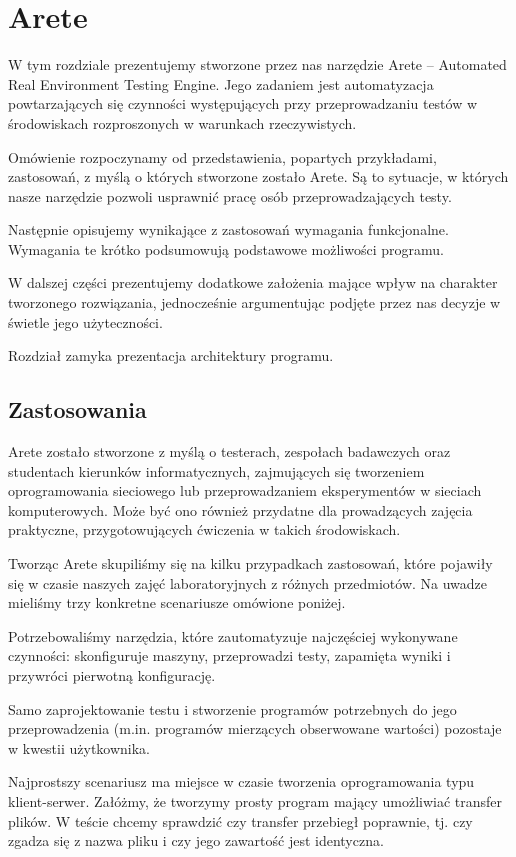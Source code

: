 \documentclass[00-praca-magisterska.tex]{subfiles}
\begin{document}
\chapter{Arete}

W tym rozdziale prezentujemy stworzone przez nas narzędzie Arete -- Automated
Real Environment Testing Engine. Jego zadaniem jest automatyzacja
powtarzających się czynności występujących przy przeprowadzaniu testów w
środowiskach rozproszonych w warunkach rzeczywistych.

Omówienie rozpoczynamy od przedstawienia, popartych przykładami, zastosowań, z
myślą o których stworzone zostało Arete. Są to sytuacje, w których nasze
narzędzie pozwoli usprawnić pracę osób przeprowadzających testy.

Następnie opisujemy wynikające z zastosowań wymagania funkcjonalne. Wymagania
te krótko podsumowują podstawowe możliwości programu.

W dalszej części prezentujemy dodatkowe założenia mające wpływ na charakter
tworzonego rozwiązania, jednocześnie argumentując podjęte przez nas decyzje w
świetle jego użyteczności.

Rozdział zamyka prezentacja architektury programu.

\section{Zastosowania}

Arete zostało stworzone z myślą o testerach, zespołach badawczych oraz
studentach kierunków informatycznych, zajmujących się tworzeniem oprogramowania
sieciowego lub przeprowadzaniem eksperymentów w sieciach komputerowych. Może być
ono również przydatne dla prowadzących zajęcia praktyczne, przygotowujących
ćwiczenia w takich środowiskach.

Tworząc Arete skupiliśmy się na kilku przypadkach zastosowań, które pojawiły
się w czasie naszych zajęć laboratoryjnych z różnych przedmiotów. Na uwadze
mieliśmy trzy konkretne scenariusze omówione poniżej.

Potrzebowaliśmy narzędzia, które zautomatyzuje najczęściej wykonywane
czynności: skonfiguruje maszyny, przeprowadzi testy, zapamięta wyniki i
przywróci pierwotną konfigurację.

Samo zaprojektowanie testu i stworzenie programów potrzebnych do jego
przeprowadzenia (m.in. programów mierzących obserwowane wartości) pozostaje w
kwestii użytkownika.

Najprostszy scenariusz ma miejsce w czasie tworzenia oprogramowania typu
klient-serwer. Załóżmy, że tworzymy prosty program mający umożliwiać transfer
plików. W teście chcemy sprawdzić czy transfer przebiegł poprawnie, tj. czy
zgadza się z nazwa pliku i czy jego zawartość jest identyczna.
\end{document}

